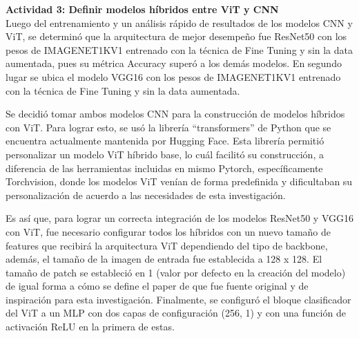 \textbf{Actividad 3:  Definir modelos híbridos entre ViT y CNN}
\\
Luego del entrenamiento y un análisis rápido de resultados de los modelos CNN y ViT, se determinó que la arquitectura de mejor desempeño fue ResNet50 con los pesos de IMAGENET1KV1 entrenado con la técnica de Fine Tuning y sin la data aumentada, pues su métrica Accuracy superó a los demás modelos. En segundo lugar se ubica el modelo VGG16 con los pesos de IMAGENET1KV1 entrenado con la técnica de Fine Tuning y sin la data aumentada.

Se decidió tomar ambos modelos CNN para la construcción de modelos híbridos con ViT. Para lograr esto, se usó la librería “transformers” de Python que se encuentra actualmente mantenida por Hugging Face. Esta librería permitió personalizar un modelo ViT híbrido base, lo cuál facilitó su construcción, a diferencia de las herramientas incluidas en mismo Pytorch, específicamente Torchvision, donde los modelos ViT venían de forma predefinida y dificultaban su personalización de acuerdo a las necesidades de esta investigación.

Es así que, para lograr un correcta integración de los modelos ResNet50 y VGG16 con ViT, fue necesario configurar todos los híbridos con un nuevo tamaño de features que recibirá la arquitectura ViT dependiendo del tipo de backbone, además, el tamaño de la imagen de entrada fue establecida a 128 x 128. El tamaño de patch se estableció en 1 (valor por defecto en la creación del modelo) de igual forma a cómo se define el paper de \cite{pr_JERBI2023autoclassViTGAN} que fue fuente original y de inspiración para esta investigación. Finalmente, se configuró el bloque clasificador del ViT a un MLP con dos capas de configuración (256, 1) y con una función de activación ReLU en la primera de estas.

